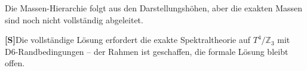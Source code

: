 \documentclass[11pt,a4paper]{article}
\newcommand{\Sstatus}{\textbf{[S]}}
\begin{document}
	Die Massen-Hierarchie folgt aus den Darstellungshöhen, aber die exakten Massen sind noch nicht vollständig abgeleitet.
	
	\Sstatus Die vollständige Lösung erfordert die exakte Spektraltheorie auf $T^4/\mathbb{Z}_3$ mit D6-Randbedingungen -- der Rahmen ist geschaffen, die formale Lösung bleibt offen.
	
	\vspace{1cm}
	\begin{center}
	\end{center}
	
\end{document}
